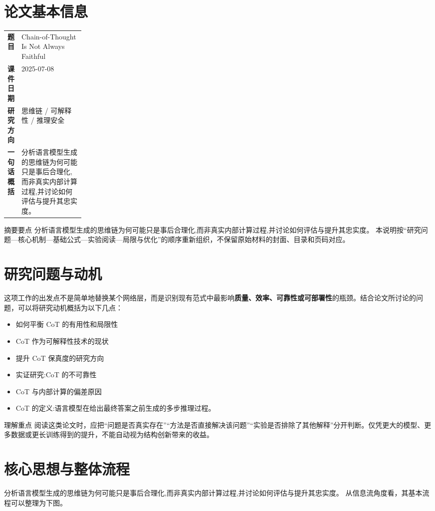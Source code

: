 \documentclass[UTF8,11pt,a4paper]{ctexart}
\newcommand{\term}[1]{\textbf{\textcolor{mainblue}{#1}}}
\begin{document}
\section{论文基本信息}
\begin{center}
\begin{tabularx}{0.94\linewidth}{>{\bfseries}p{0.18\linewidth}X}
\toprule
题目 & Chain-of-Thought Is Not Always Faithful\\
课件日期 & 2025-07-08\\
研究方向 & 思维链 / 可解释性 / 推理安全\\
一句话概括 & 分析语言模型生成的思维链为何可能只是事后合理化,而非真实内部计算过程,并讨论如何评估与提升其忠实度。\\
\bottomrule
\end{tabularx}
\end{center}

\begin{infobox}{摘要要点}
分析语言模型生成的思维链为何可能只是事后合理化,而非真实内部计算过程,并讨论如何评估与提升其忠实度。 本说明按“研究问题—核心机制—基础公式—实验阅读—局限与优化”的顺序重新组织，不保留原始材料的封面、目录和页码对应。
\end{infobox}

\section{研究问题与动机}
这项工作的出发点不是简单地替换某个网络层，而是识别现有范式中最影响\term{质量、效率、可靠性或可部署性}的瓶颈。结合论文所讨论的问题，可以将研究动机概括为以下几点：
\begin{itemize}
\item 如何平衡 CoT 的有用性和局限性
\item CoT 作为可解释性技术的现状
\item 提升 CoT 保真度的研究方向
\item 实证研究:CoT 的不可靠性
\item CoT 与内部计算的偏差原因
\item CoT 的定义:语言模型在给出最终答案之前生成的多步推理过程。
\end{itemize}

\begin{notebox}{理解重点}
阅读这类论文时，应把“问题是否真实存在”“方法是否直接解决该问题”“实验是否排除了其他解释”分开判断。仅凭更大的模型、更多数据或更长训练得到的提升，不能自动视为结构创新带来的收益。
\end{notebox}

\section{核心思想与整体流程}
分析语言模型生成的思维链为何可能只是事后合理化,而非真实内部计算过程,并讨论如何评估与提升其忠实度。 从信息流角度看，其基本流程可以整理为下图。
\end{document}
